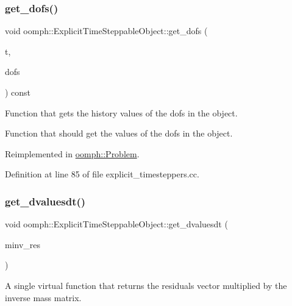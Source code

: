 \subsubsection{\texorpdfstring{get\+\_\+dofs()}{get\_dofs()}\hspace{0.1cm}{\footnotesize\ttfamily [2/2]}}
{\footnotesize\ttfamily void oomph\+::\+Explicit\+Time\+Steppable\+Object\+::get\+\_\+dofs (\begin{DoxyParamCaption}\item[{const unsigned \&}]{t,  }\item[{\hyperlink{classoomph_1_1DoubleVector}{Double\+Vector} \&}]{dofs }\end{DoxyParamCaption}) const\hspace{0.3cm}{\ttfamily [virtual]}}



Function that gets the history values of the dofs in the object. 

Function that should get the values of the dofs in the object. 

Reimplemented in \hyperlink{classoomph_1_1Problem_abb56c404b0dd6df75bcadab797d9a24e}{oomph\+::\+Problem}.



Definition at line 85 of file explicit\+\_\+timesteppers.\+cc.

\mbox{\label{classoomph_1_1ExplicitTimeSteppableObject_ab1e7d8d7ec548b26ed039b61a9eba9c4}} 
\subsubsection{\texorpdfstring{get\+\_\+dvaluesdt()}{get\_dvaluesdt()}}
{\footnotesize\ttfamily void oomph\+::\+Explicit\+Time\+Steppable\+Object\+::get\+\_\+dvaluesdt (\begin{DoxyParamCaption}\item[{\hyperlink{classoomph_1_1DoubleVector}{Double\+Vector} \&}]{minv\+\_\+res }\end{DoxyParamCaption})\hspace{0.3cm}{\ttfamily [virtual]}}



A single virtual function that returns the residuals vector multiplied by the inverse mass matrix. 



